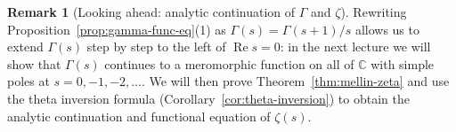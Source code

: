 \documentclass[11pt]{article}
\theoremstyle{plain}
\theoremstyle{definition}
\theoremstyle{boldremark}
\newtheorem*{remark}{Remark}
\theoremstyle{remark}
\numberwithin{equation}{section}
\newcommand{\C}{\mathbb{C}}
\DeclareMathOperator{\Real}{Re}
\begin{document}
\begin{remark}[Looking ahead: analytic continuation of $\Gamma$ and $\zeta$]
Rewriting Proposition~\ref{prop:gamma-func-eq}(1) as
$\Gamma(s)=\Gamma(s+1)/s$ allows us to extend $\Gamma(s)$ step by step to
the left of $\Real s = 0$: in the next lecture we will show that $\Gamma(s)$
continues to a meromorphic function on all of $\C$ with simple poles at
$s=0,-1,-2,\dots$. We will then prove Theorem~\ref{thm:mellin-zeta} and use
the theta inversion formula (Corollary~\ref{cor:theta-inversion}) to obtain
the analytic continuation and functional equation of $\zeta(s)$.
\end{remark}
\end{document}
